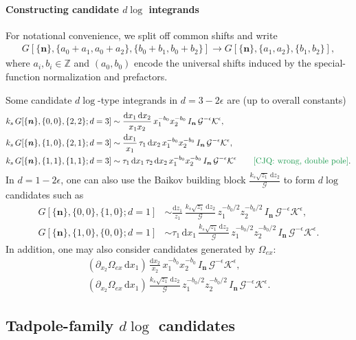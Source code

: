 \documentclass[a4paper,12pt]{article}
\newcommand{\n}{\nonumber}
\def\di{{\mathrm{d}}}
\def\ep{\epsilon}
\newcommand{\mG}{\mathcal{G}}
\newcommand{\mK}{\mathcal{K}}
\def\to{\rightarrow}
\newcommand{\cjq}[1]{{\color[rgb]{.1,.6,.3}{[{CJQ:} #1]}}}
\begin{document}
\paragraph{Constructing candidate $d\log$ integrands}
For notational convenience, we split off common shifts and write
\begin{align}
	G[\{\bm n\},\{a_0+a_1,a_0+a_2\},\{b_0+b_1,b_0+b_2\}]\to G[\{\bm n\},\{a_1,a_2\},\{b_1,b_2\}],
\end{align}
where $a_i,b_i\in\mathbb Z$ and $(a_0,b_0)$ encode the universal shifts induced by the special-function normalization and prefactors.

Some candidate $d\log$-type integrands in $d=3-2\ep$ are (up to overall constants)
\begin{align}
	k_s\,G[\{\bm n\},\{0,0\},\{2,2\};d=3]
	&\sim \frac{\di x_1\,\di x_2}{x_1 x_2}\,x_1^{-b_0}x_2^{-b_0}\,I_{\bm n}\,\mG^{-\ep}\mK^{\ep}, \n\\
	k_s\,G[\{\bm n\},\{1,0\},\{2,1\};d=3]
	&\sim \frac{\di x_1}{x_1}\,\tau_1\,\di x_2\,x_1^{-b_0}x_2^{-b_0}\,I_{\bm n}\,\mG^{-\ep}\mK^{\ep}, \n\\
	k_s\,G[\{\bm n\},\{1,1\},\{1,1\};d=3]
	&\sim \tau_1\,\di x_1\,\tau_2\,\di x_2\,x_1^{-b_0}x_2^{-b_0}\,I_{\bm n}\,\mG^{-\ep}\mK^{\ep}\qquad \text{\cjq{wrong, double pole}}.
\end{align}
In $d=1-2\ep$, one can also use the Baikov building block $\frac{k_s\sqrt{z_1}\,\di z_2}{\mG}$ to form $d\log$ candidates such as
\begin{align}
	G[\{\bm n\},\{0,0\},\{1,0\};d=1]
	&\sim \frac{\di z_1}{z_1}\,\frac{k_s\sqrt{z_1}\,\di z_2}{\mG}\,
	z_1^{-b_0/2}z_2^{-b_0/2}\,I_{\bm n}\,\mG^{-\ep}\mK^{\ep}, \n\\
	G[\{\bm n\},\{1,0\},\{0,0\};d=1]
	&\sim \tau_1\,\di x_1\,\frac{k_s\sqrt{z_1}\,\di z_2}{\mG}\,
	z_1^{-b_0/2}z_2^{-b_0/2}\,I_{\bm n}\,\mG^{-\ep}\mK^{\ep}.
\end{align}
In addition, one may also consider candidates generated by $\Omega_{ex}$:
\begin{align}
	(\partial_{x_2}\Omega_{ex}\,\di x_1)\,\frac{\di x_2}{x_2}\,
	x_1^{-b_0}x_2^{-b_0}\,I_{\bm n}\,\mG^{-\ep}\mK^{\ep}, \n\\
	(\partial_{x_2}\Omega_{ex}\,\di x_1)\,\frac{k_s\sqrt{z_1}\,\di z_2}{\mG}\,
	z_1^{-b_0/2}z_2^{-b_0/2}\,I_{\bm n}\,\mG^{-\ep}\mK^{\ep}.
\end{align}

\subsection{Tadpole-family \texorpdfstring{$d\log$}{dlog} candidates}
\end{document}

